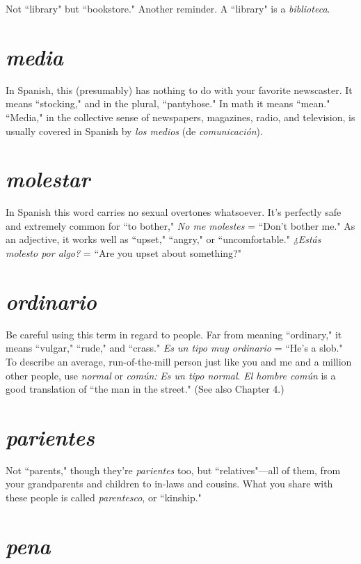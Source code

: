 Not ``library" but ``bookstore." Another reminder.
A ``library" is a \emph{biblioteca}.

\section{\emph{media}}

In Spanish, this (presumably) has nothing to do with
your favorite newscaster. It means ``stocking," and in the plural,
``pantyhose." In math it means ``mean." ``Media," in the collective
sense of newspapers, magazines, radio, and television, is usually covered in Spanish by \emph{los medios} (de \emph{comunicación}).

\section{\emph{molestar}}

In Spanish this word carries no sexual overtones
whatsoever. It's perfectly safe and extremely common for ``to bother,"
\emph{No me molestes} = ``Don't bother me." As an adjective, it works well
as ``upset," ``angry," or ``uncomfortable." \emph{¿Estás molesto por algo?} =
``Are you upset about something?"

\section{\emph{ordinario}}

Be careful using this term in regard to people.
Far from meaning ``ordinary," it means ``vulgar," ``rude," and ``crass."
\emph{Es un tipo muy ordinario} = ``He's a slob." To describe an average, run-of-the-mill person just like you and me and a million other people, use
\emph{normal} or \emph{común:} \emph{Es un tipo normal}. \emph{El hombre común} is a good
translation of ``the man in the street." (See also Chapter 4.)

\section{\emph{parientes}}

Not ``parents," though they're \emph{parientes} too, but
``relatives"---all of them, from your grandparents and children to in-laws and cousins. What you share with these people is called \emph{parentesco}, or ``kinship."

\section{\emph{pena}}

